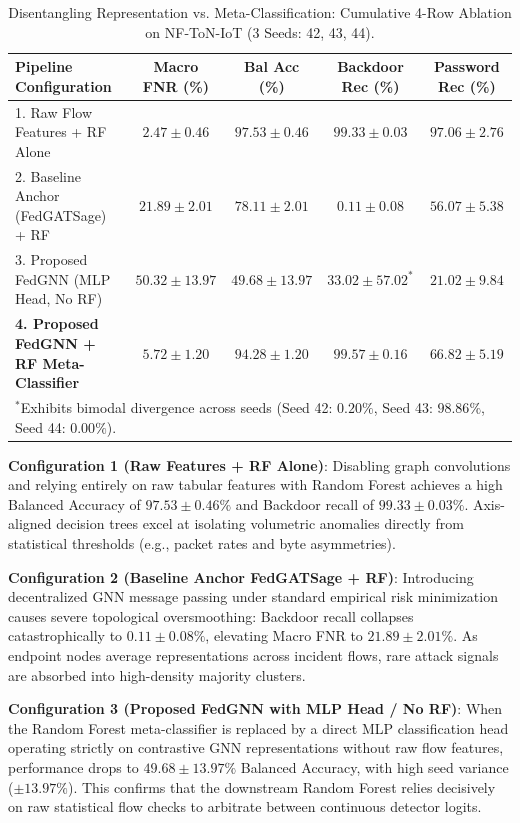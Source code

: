 \documentclass[journal,onecolumn]{IEEEtran}
\begin{document}
\begin{table}[!t]
\centering
\caption{Disentangling Representation vs. Meta-Classification: Cumulative 4-Row Ablation on NF-ToN-IoT (3 Seeds: 42, 43, 44).}
\label{tab:ablation}
\small
\begin{tabular}{lcccc}
\toprule
\textbf{Pipeline Configuration} & \textbf{Macro FNR (\%)} & \textbf{Bal Acc (\%)} & \textbf{Backdoor Rec (\%)} & \textbf{Password Rec (\%)} \\
\midrule
1. Raw Flow Features + RF Alone & $2.47 \pm 0.46$ & $97.53 \pm 0.46$ & $99.33 \pm 0.03$ & $97.06 \pm 2.76$ \\
2. Baseline Anchor (FedGATSage) + RF & $21.89 \pm 2.01$ & $78.11 \pm 2.01$ & $0.11 \pm 0.08$ & $56.07 \pm 5.38$ \\
3. Proposed FedGNN (MLP Head, No RF) & $50.32 \pm 13.97$ & $49.68 \pm 13.97$ & $33.02 \pm 57.02^*$ & $21.02 \pm 9.84$ \\
\textbf{4. Proposed FedGNN + RF Meta-Classifier} & $\mathbf{5.72 \pm 1.20}$ & $\mathbf{94.28 \pm 1.20}$ & $\mathbf{99.57 \pm 0.16}$ & $\mathbf{66.82 \pm 5.19}$ \\
\bottomrule
\multicolumn{5}{l}{\footnotesize $^*$Exhibits bimodal divergence across seeds (Seed 42: $0.20\%$, Seed 43: $98.86\%$, Seed 44: $0.00\%$).}
\end{tabular}
\end{table}

\textbf{Configuration 1 (Raw Features + RF Alone)}: Disabling graph convolutions and relying entirely on raw tabular features with Random Forest achieves a high Balanced Accuracy of $97.53 \pm 0.46\%$ and Backdoor recall of $99.33 \pm 0.03\%$. Axis-aligned decision trees excel at isolating volumetric anomalies directly from statistical thresholds (e.g., packet rates and byte asymmetries).

\textbf{Configuration 2 (Baseline Anchor FedGATSage + RF)}: Introducing decentralized GNN message passing under standard empirical risk minimization causes severe topological oversmoothing: Backdoor recall collapses catastrophically to $0.11 \pm 0.08\%$, elevating Macro FNR to $21.89 \pm 2.01\%$. As endpoint nodes average representations across incident flows, rare attack signals are absorbed into high-density majority clusters.

\textbf{Configuration 3 (Proposed FedGNN with MLP Head / No RF)}: When the Random Forest meta-classifier is replaced by a direct MLP classification head operating strictly on contrastive GNN representations without raw flow features, performance drops to $49.68 \pm 13.97\%$ Balanced Accuracy, with high seed variance ($\pm 13.97\%$). This confirms that the downstream Random Forest relies decisively on raw statistical flow checks to arbitrate between continuous detector logits.
\end{document}
